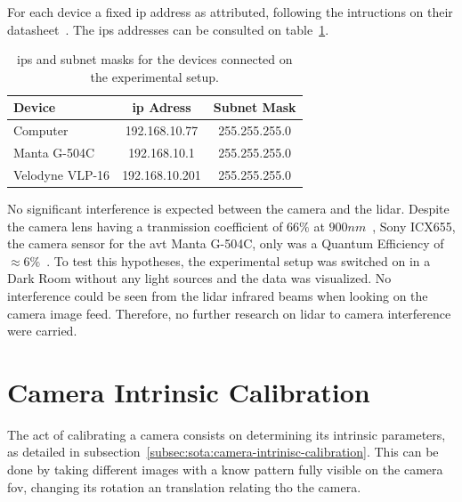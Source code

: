 For each device a fixed \ac{ip} address as attributed, following the intructions on their datasheet~\cite{VLP16, MantaVision2013}. The \acp{ip} addresses can be consulted on table~\ref{tab:experimental-setup-ip}.

\begin{table}[H]
	\renewcommand{\arraystretch}{1.2}
	\centering
	\begin{tabular}{@{}lcc@{}}
		\toprule
		Device          & \ac{ip} Adress & Subnet Mask\\ \midrule
		Computer        & 192.168.10.77  & 255.255.255.0 \\
		Manta G-504C    & 192.168.10.1   & 255.255.255.0 \\
		Velodyne VLP-16 & 192.168.10.201 & 255.255.255.0 \\
		\bottomrule
	\end{tabular}
	\label{tab:experimental-setup-ip}
	\caption{\acp{ip} and subnet masks for the devices connected on the experimental setup.}
\end{table}

No significant interference is expected between the camera and the \ac{lidar}. Despite the camera lens having a tranmission coefficient of $66\%$ at $900 nm$~\cite{Thorlabs}, Sony ICX655, the camera sensor for the \ac{avt} Manta G-504C, only was a Quantum Efficiency of $\approx 6\%$~\cite{MantaG504C}. To test this hypotheses, the experimental setup was switched on in a Dark Room without any light sources and the data was visualized. No interference could be seen from the \ac{lidar} infrared beams when looking on the camera image feed. Therefore, no further research on \ac{lidar} to camera interference were carried. 





\section{Camera Intrinsic Calibration}
\label{sec:calibration:camera}
The act of calibrating a camera consists on determining its intrinsic parameters, as detailed in subsection~\ref{subsec:sota:camera-intrinisc-calibration}. This can be done by taking different images with a know pattern fully visible on the camera \ac{fov}, changing its rotation an translation relating tho the camera.

